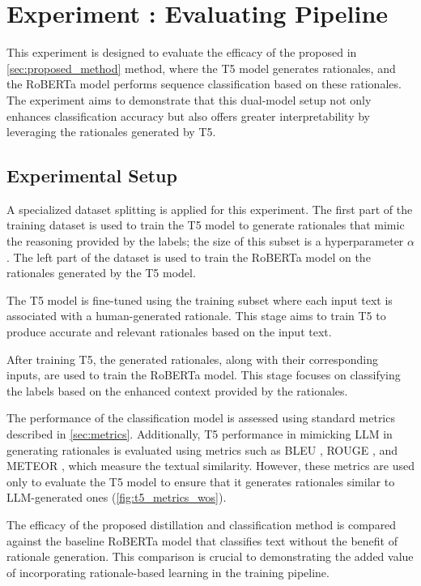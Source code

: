 \section{Experiment \theexperiment: Evaluating Pipeline}

This experiment is designed to evaluate the efficacy of the proposed in \autoref{sec:proposed_method} method, where the T5 model generates rationales, and the RoBERTa model performs sequence classification based on these rationales. The experiment aims to demonstrate that this dual-model setup not only enhances classification accuracy but also offers greater interpretability by leveraging the rationales generated by T5.

\subsection*{Experimental Setup}

A specialized dataset splitting is applied for this experiment. The first part of the training dataset is used to train the T5 model to generate rationales that mimic the reasoning provided by the labels; the size of this subset is a hyperparameter $\alpha$. The left part of the dataset is used to train the RoBERTa model on the rationales generated by the T5 model.

The T5 model is fine-tuned using the training subset where each input text is associated with a human-generated rationale. This stage aims to train T5 to produce accurate and relevant rationales based on the input text.

After training T5, the generated rationales, along with their corresponding inputs, are used to train the RoBERTa model. This stage focuses on classifying the labels based on the enhanced context provided by the rationales.

The performance of the classification model is assessed using standard metrics described in \autoref{sec:metrics}. Additionally, T5 performance in mimicking LLM in generating rationales is evaluated using metrics such as BLEU \cite{bleu}, ROUGE \cite{rouge}, and METEOR \cite{meteor}, which measure the textual similarity. However, these metrics are used only to evaluate the T5 model to ensure that it generates rationales similar to LLM-generated ones (\autoref{fig:t5_metrics_wos}).

The efficacy of the proposed distillation and classification method is compared against the baseline RoBERTa model that classifies text without the benefit of rationale generation. This comparison is crucial to demonstrating the added value of incorporating rationale-based learning in the training pipeline.

